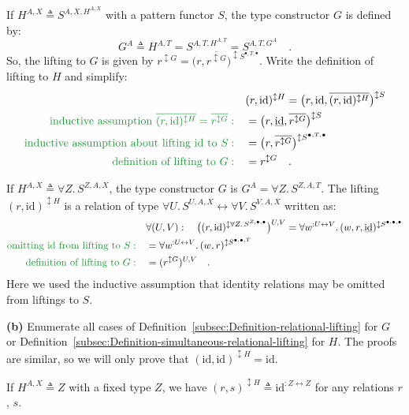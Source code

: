 If $H^{A,X}\triangleq S^{A,X,H^{A,X}}$ with a pattern functor $S$,
the type constructor $G$ is defined by: 
\[
G^{A}\triangleq H^{A,T}=S^{A,T,H^{A,T}}=S^{A,T,G^{A}}\quad.
\]
So, the lifting to $G$ is given by $r^{\updownarrow G}=\big(r,\overline{r^{\updownarrow G}}\big)^{\updownarrow S^{\bullet,T,\bullet}}$.
Write the definition of lifting to $H$ and simplify:
\begin{align*}
 & (r,\text{id})^{\updownarrow H}=\big(r,\text{id},\overline{(r,\text{id})^{\updownarrow H}}\big)^{\updownarrow S}\\
{\color{greenunder}\text{inductive assumption }\overline{(r,\text{id})^{\updownarrow H}}=\overline{r^{\updownarrow G}}:}\quad & =\big(r,\gunderline{\text{id}},\overline{r^{\updownarrow G}}\big)^{\updownarrow S}\\
{\color{greenunder}\text{inductive assumption about lifting id to }S:}\quad & =\big(r,\overline{r^{\updownarrow G}}\big)^{\updownarrow S^{\bullet,T,\bullet}}\\
{\color{greenunder}\text{definition of lifting to }G:}\quad & =r^{\updownarrow G}\quad.
\end{align*}

If $H^{A,X}\triangleq\forall Z.\,S^{Z,A,X}$, the type constructor
$G$ is $G^{A}=\forall Z.\,S^{Z,A,T}$. The lifting $(r,\text{id})^{\updownarrow H}$
is a relation of type $\forall U.\,S^{U,A,X}\leftrightarrow\forall V.\,S^{V,A,X}$
written as:
\begin{align*}
 & \forall(U,V):\quad\big((r,\text{id})^{\updownarrow\forall Z.\,S^{Z,\bullet,\bullet}}\big)^{U,V}=\forall w^{:U\leftrightarrow V}.\,(w,r,\gunderline{\text{id}})^{\updownarrow S^{\bullet,\bullet,\bullet}}\\
{\color{greenunder}\text{omitting id from lifting to }S:}\quad & =\forall w^{:U\leftrightarrow V}.\,(w,r)^{\updownarrow S^{\bullet,\bullet,T}}\\
{\color{greenunder}\text{definition of lifting to }G:}\quad & =(r^{\updownarrow G})^{U,V}\quad.
\end{align*}
Here we used the inductive assumption that identity relations may
be omitted from liftings to $S$.

\textbf{(b)} Enumerate all cases of Definition~\ref{subsec:Definition-relational-lifting}
for $G$ or Definition~\ref{subsec:Definition-simultaneous-relational-lifting}
for $H$. The proofs are similar, so we will only prove that $(\text{id},\text{id})^{\updownarrow H}=\text{id}$.

If $H^{A,X}\triangleq Z$ with a fixed type $Z$, we have $(r,s)^{\updownarrow H}\triangleq\text{id}^{:Z\leftrightarrow Z}$
for any relations $r$, $s$.


